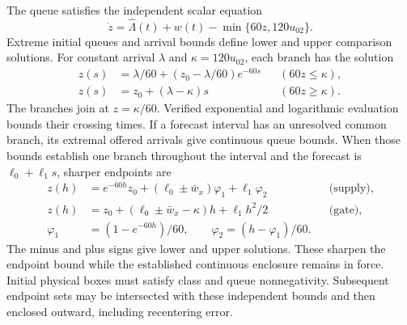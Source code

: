 \documentclass[preprint,12pt]{elsarticle}
\begin{document}
The queue satisfies the independent scalar equation
\begin{equation}
 \dot z=\widehat\Lambda(t)+w(t)-\min\{60z,120u_{02}\}.
 \label{eq:structure-scalar-queue}
\end{equation}
Extreme initial queues and arrival bounds define lower and upper
comparison solutions. For constant arrival $\lambda$ and
$\kappa=120u_{02}$, each branch has the solution
\begin{equation}
 \begin{aligned}
 z(s)&=\lambda/60+(z_0-\lambda/60)e^{-60s}&&(60z\le \kappa),\\
 z(s)&=z_0+(\lambda-\kappa)s&&(60z\ge \kappa).
 \end{aligned}
 \label{eq:structure-queue-flows}
\end{equation}
The branches join at $z=\kappa/60$. Verified exponential and logarithmic
evaluation bounds their crossing times. If a forecast interval has an
unresolved common branch, its extremal offered arrivals give continuous
queue bounds. When those bounds establish one branch throughout the
interval and the forecast is $\ell_0+\ell_1s$, sharper endpoints are
\begin{equation}
\begin{aligned}
 z(h)&=e^{-60h}z_0+(\ell_0\pm\bar w_x)\varphi_1+\ell_1\varphi_2
       &&\text{(supply)},\\
 z(h)&=z_0+(\ell_0\pm\bar w_x-\kappa)h+\ell_1h^2/2
       &&\text{(gate)},\\
 \varphi_1&=(1-e^{-60h})/60,\qquad
 \varphi_2=(h-\varphi_1)/60.
\end{aligned}
\end{equation}
The minus and plus signs give lower and upper solutions. These sharpen
the endpoint bound while the established continuous enclosure remains
in force. Initial physical boxes must satisfy class and queue
nonnegativity. Subsequent endpoint sets may be intersected with these
independent bounds and then enclosed outward, including recentering error.
\end{document}
